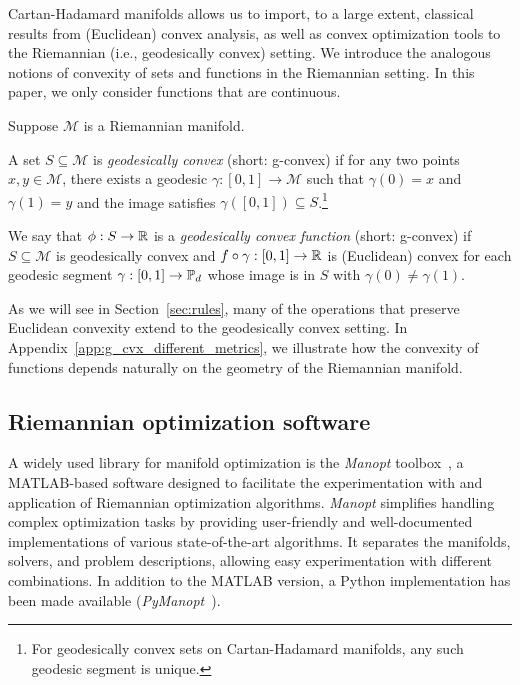 \documentclass[twoside,11pt]{article}
\begin{document}
Cartan-Hadamard manifolds allows us to import, to a large extent, classical results from (Euclidean) convex analysis, as well as convex optimization tools to the Riemannian (i.e., geodesically convex) setting. We introduce the analogous notions of convexity of sets and functions in the Riemannian setting. In this paper, we only consider functions that are continuous. 

Suppose $\mathcal{M}$ is a Riemannian manifold.
%
\begin{definition}\label{def:g-convex-s}
A set $S \subseteq \mathcal{M}$ is \emph{geodesically convex} (short: g-convex) if for any two points $x,y \in \mathcal{M}$, there exists a geodesic $\gamma:[0,1] \to  \mathcal{M}$ such that $\gamma(0) = x$ and $\gamma(1) = y$ and the image satisfies $\gamma([0,1]) \subseteq S$.\footnote{For geodesically convex sets on Cartan-Hadamard manifolds, any such geodesic segment is unique.}
\end{definition}
%
\begin{definition}
\label{def:g-convex-f}
    We say that $\phi: S \to \mathbb{R}$ is a \emph{geodesically convex function} (short: g-convex) if $S \subseteq \mathcal{M}$ is geodesically convex and $f \circ \gamma :[0,1] \to \mathbb{R}$ is (Euclidean) convex for each geodesic segment $\gamma :[0,1] \to \mathbb{P}_d$ whose image is in $S$ with $\gamma(0) \neq \gamma(1)$.
\end{definition}
%

As we will see in Section~\ref{sec:rules}, many of the operations that preserve Euclidean convexity extend to the geodesically convex setting. In Appendix~\ref{app:g_cvx_different_metrics}, we illustrate how the convexity of functions depends naturally on the geometry of the Riemannian manifold. 
 

\subsection{Riemannian optimization software}

A widely used library for manifold optimization is the \textsl{Manopt} toolbox~\citep{manopt}, a MATLAB-based software designed to facilitate the experimentation with and application of Riemannian optimization algorithms. \textsl{Manopt} simplifies handling complex optimization tasks by providing user-friendly and well-documented implementations of various state-of-the-art algorithms. It separates the manifolds, solvers, and problem descriptions, allowing easy experimentation with different combinations. 
In addition to the MATLAB version, a Python implementation has been made available (\textsl{PyManopt}~\citep{pymanopt}).
\end{document}
